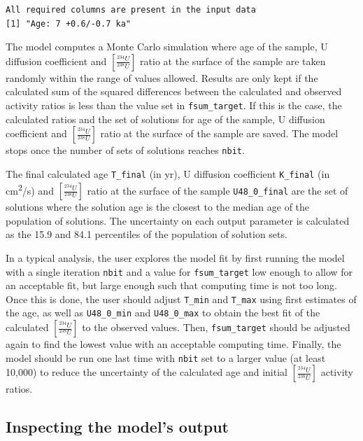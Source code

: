 \documentclass[]{elsarticle} %
\begin{document}
\begin{verbatim}
All required columns are present in the input data
[1] "Age: 7 +0.6/-0.7 ka"
\end{verbatim}

The model computes a Monte Carlo simulation where age of the sample, U diffusion coefficient and \([\frac{^{234}U}{^{238}U}]\) ratio at the surface of the sample are taken randomly within the range of values allowed. Results are only kept if the calculated sum of the squared differences between the calculated and observed activity ratios is less than the value set in \texttt{fsum\_target}. If this is the case, the calculated ratios and the set of solutions for age of the sample, U diffusion coefficient and \([\frac{^{234}U}{^{238}U}]\) ratio at the surface of the sample are saved. The model stops once the number of sets of solutions reaches \texttt{nbit}.

The final calculated age \texttt{T\_final} (in yr), U diffusion coefficient \texttt{K\_final} (in cm\textsuperscript{2}/s) and \([\frac{^{234}U}{^{238}U}]\) ratio at the surface of the sample \texttt{U48\_0\_final} are the set of solutions where the solution age is the closest to the median age of the population of solutions. The uncertainty on each output parameter is calculated as the 15.9 and 84.1 percentiles of the population of solution sets.

In a typical analysis, the user explores the model fit by first running the model with a single iteration \texttt{nbit} and a value for \texttt{fsum\_target} low enough to allow for an acceptable fit, but large enough such that computing time is not too long. Once this is done, the user should adjust \texttt{T\_min} and \texttt{T\_max} using first estimates of the age, as well as \texttt{U48\_0\_min} and \texttt{U48\_0\_max} to obtain the best fit of the calculated \([\frac{^{234}U}{^{238}U}]\) to the observed values. Then, \texttt{fsum\_target} should be adjusted again to find the lowest value with an acceptable computing time. Finally, the model should be run one last time with \texttt{nbit} set to a larger value (at least 10,000) to reduce the uncertainty of the calculated age and initial \([\frac{^{234}U}{^{238}U}]\) activity ratios.

\hypertarget{inspecting-the-models-output}{%
\subsection{Inspecting the model's output}\label{inspecting-the-models-output}}
\end{document}
